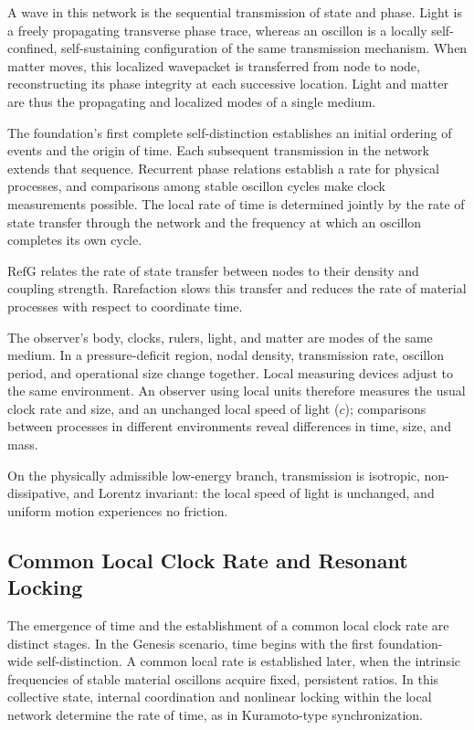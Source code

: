 \documentclass[11pt,a4paper]{article}
\newcommand{\RefG}{\mathrm{RefG}}
\begin{document}
A wave in this network is the sequential transmission of state and phase. Light is a freely propagating transverse phase trace, whereas an oscillon is a locally self-confined, self-sustaining configuration of the same transmission mechanism. When matter moves, this localized wavepacket is transferred from node to node, reconstructing its phase integrity at each successive location. Light and matter are thus the propagating and localized modes of a single medium.

The foundation's first complete self-distinction establishes an initial ordering of events and the origin of time. Each subsequent transmission in the network extends that sequence. Recurrent phase relations establish a rate for physical processes, and comparisons among stable oscillon cycles make clock measurements possible. The local rate of time is determined jointly by the rate of state transfer through the network and the frequency at which an oscillon completes its own cycle.

$\RefG$ relates the rate of state transfer between nodes to their density and coupling strength. Rarefaction slows this transfer and reduces the rate of material processes with respect to coordinate time.

The observer's body, clocks, rulers, light, and matter are modes of the same medium. In a pressure-deficit region, nodal density, transmission rate, oscillon period, and operational size change together. Local measuring devices adjust to the same environment. An observer using local units therefore measures the usual clock rate and size, and an unchanged local speed of light ($c$); comparisons between processes in different environments reveal differences in time, size, and mass.

On the physically admissible low-energy branch, transmission is isotropic, non-dissipative, and Lorentz invariant: the local speed of light is unchanged, and uniform motion experiences no friction.

\subsection{Common Local Clock Rate and Resonant Locking}

The emergence of time and the establishment of a common local clock rate are distinct stages. In the Genesis scenario, time begins with the first foundation-wide self-distinction. A common local rate is established later, when the intrinsic frequencies of stable material oscillons acquire fixed, persistent ratios. In this collective state, internal coordination and nonlinear locking within the local network determine the rate of time, as in Kuramoto-type synchronization.
\end{document}
